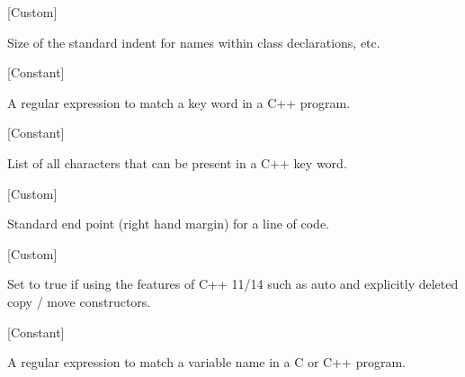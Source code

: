 \vspace{1em}
\noindent
{}
\usebox{\funcname}
 \hfill [Custom]

\begin{doc-string}
Size of the standard indent for names within class declarations, etc.
\end{doc-string}

\vspace{1em}
\noindent
{}
\usebox{\funcname}
 \hfill [Constant]

\begin{doc-string}
A regular expression to match a key word in a C++ program.
\end{doc-string}

\vspace{1em}
\noindent
{}
\usebox{\funcname}
 \hfill [Constant]

\begin{doc-string}
List of all characters that can be present in a C++ key word.
\end{doc-string}

\vspace{1em}
\noindent
{}
\usebox{\funcname}
 \hfill [Custom]

\begin{doc-string}
Standard end point (right hand margin) for a line of code.
\end{doc-string}

\vspace{1em}
\noindent
{}
\usebox{\funcname}
 \hfill [Custom]

\begin{doc-string}
Set to true if using the features of C++ 11/14 such as auto and explicitly
deleted copy / move constructors.
\end{doc-string}

\vspace{1em}
\noindent
{}
\usebox{\funcname}
 \hfill [Constant]

\begin{doc-string}
A regular expression to match a variable name in a C or C++ program.
\end{doc-string}

